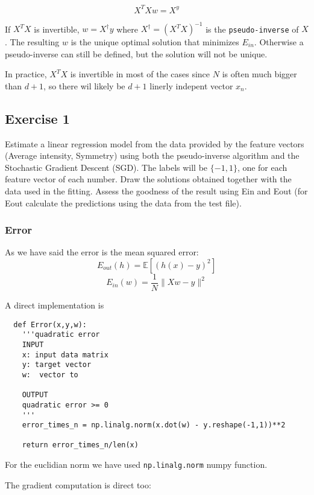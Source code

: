 $$X^TXw = X^y$$

If $X^TX$ is invertible, $w = X^\dagger y$ where $X^\dagger = (X^T X)^{-1}$ is the \texttt{pseudo-inverse} of $X$. The resulting $w$ is the unique optimal solution that minimizes $E_{in}$.  Otherwise a pseudo-inverse can still be defined, but the solution will not be unique.

In practice, $X^TX$ is invertible in most of the cases since $N$ is often much bigger than $d+1$, so there wil likely be $d+1$ linerly indepent vector $x_n$.



\subsection{Exercise 1}

Estimate a linear regression model from the data provided by the
feature vectors (Average intensity, Symmetry)
using both the pseudo-inverse algorithm and the Stochastic Gradient Descent (SGD).
The labels will be $\{-1,1\}$,
one for each feature vector of each number.
Draw the solutions obtained together with the data used in the fitting.
Assess the goodness of the result using Ein and Eout
(for Eout calculate the predictions using the data from the test file).



\subsubsection{Error}


As we have said the error is the mean squared error:
$$E_{out}(h) = \mathbb E [(h(x) -y)^2]$$
 $$E_{in}(w)  = \frac{1}{N} \| Xw -y \|^2$$

A direct implementation is

\begin{verbatim}
  def Error(x,y,w):
    '''quadratic error 
    INPUT
    x: input data matrix
    y: target vector
    w:  vector to 

    OUTPUT
    quadratic error >= 0
    '''
    error_times_n = np.linalg.norm(x.dot(w) - y.reshape(-1,1))**2
  
    return error_times_n/len(x)

  \end{verbatim}

  

  For the euclidian norm we have used \texttt{np.linalg.norm} \cite{norm} numpy function.

  The gradient computation is direct too:

